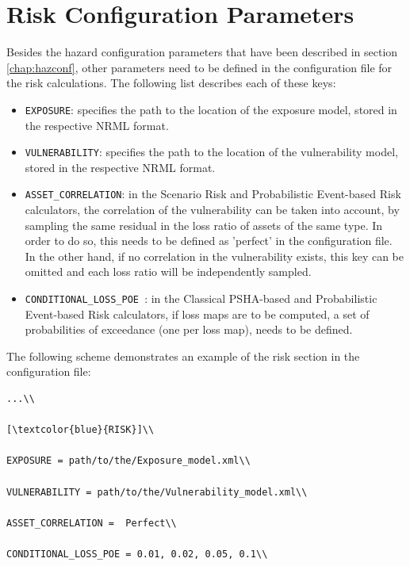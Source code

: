 \section{ Risk Configuration Parameters}

Besides the hazard configuration parameters that have been described in section \ref{chap:hazconf}, other parameters need to be defined in the configuration file for the risk calculations. The following list describes each of these keys:

\begin{itemize}
\item \Verb+EXPOSURE+: specifies the path to the location of the exposure model, stored in the respective NRML format.
\item \Verb+VULNERABILITY+: specifies the path to the location of the vulnerability model, stored in the respective NRML format. 
\item \Verb+ASSET_CORRELATION+: in the Scenario Risk and Probabilistic Event-based Risk calculators, the correlation of the vulnerability can be taken into account, by sampling the same residual in the loss ratio of assets of the same type. In order to do so, this needs to be defined as 'perfect' in the configuration file. In the other hand, if no correlation in the vulnerability exists, this key can be omitted and each loss ratio will be independently sampled. 
\item \Verb+CONDITIONAL_LOSS_POE +: in the Classical PSHA-based and Probabilistic Event-based Risk calculators, if loss maps are to be computed, a set of probabilities of exceedance (one per loss map), needs to be defined.
\end{itemize}

The following scheme demonstrates an example of the risk section in the configuration file:

\begin{Verbatim}[frame=single, commandchars=\\\{\}, samepage=true]
...\\

[\textcolor{blue}{RISK}]\\

EXPOSURE = path/to/the/Exposure_model.xml\\

VULNERABILITY = path/to/the/Vulnerability_model.xml\\

ASSET_CORRELATION =  Perfect\\

CONDITIONAL_LOSS_POE = 0.01, 0.02, 0.05, 0.1\\

\end{Verbatim}

